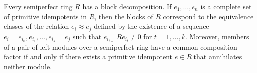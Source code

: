Every semiperfect ring $R$ has a block decomposition. If $e_1, \ldots, e_n$ is a complete set of primitive idempotents in $R$, then the blocks of $R$ correspond to the equivalence classes of the relation $e_i \approx e_j$ defined by the existence of a sequence $e_i = e_{i_0}, e_{i_1}, \ldots, e_{i_k} = e_j$ such that $e_{i_{t-1}} R e_{i_t} \neq 0$ for $t = 1, \ldots, k$. Moreover, members of a pair of left modules over a semiperfect ring have a common composition factor if and only if there exists a primitive idempotent $e \in R$ that annihilates neither module.
